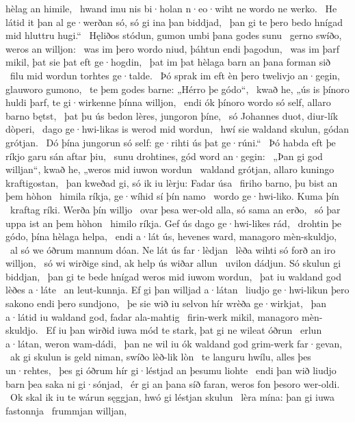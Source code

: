 hèlag an himile, \hld\ hwand imu nis bi·holan n·eo·wiht
ne wordo ne werko. \hld\ He látid it þan al ge·werðan só,
só gi ina þan biddjad, \hld\ þan gi te þero bedo hnígad
mid hluttru hugi.“ \hld\ Hęliðos stódun,
gumon umbi þana godes sunu \hld\ gerno swíðo,
weros an willjon: \hld\ was im þero wordo niud,
þáhtun endi þagodun, \hld\ was im þarf mikil,
þat sie þat eft ge·hogdin, \hld\ þat im þat hèlaga barn
an þana forman sið \hld\ filu mid wordun
torhtes ge·talde. \hld\ Þó sprak im eft èn þero twelivjo an·gegin,
glauworo gumono, \hld\ te þem godes barne:
„Hérro þe gódo“, \hld\ kwað he, „ús is þínoro huldi þarf,
te gi·wirkenne þínna willjon, \hld\ endi ók þínoro wordo só self,
allaro barno bętst, \hld\ þat þu ús bedon lères,
jungoron þíne, \hld\ só Johannes duot,
diur-lík dòperi, \hld\ dago ge·hwi-likas
is werod mid wordun, \hld\ hwí sie waldand skulun,
gódan grótjan. \hld\ Dó þína jungorun só self:
ge·rihti ús þat ge·rúni.“ \hld\ Þó habda eft þe ríkjo garu
sán aftar þiu, \hld\ sunu drohtines,
gód word an·gegin: \hld\ „Þan gi god willjan“, kwað he,
„weros mid iuwon wordun \hld\ waldand grótjan,
allaro kuningo kraftigostan, \hld\ þan kweðad gi, só ik iu lèrju:
Fadar úsa \hld\ firiho barno,
þu bist an þem hòhon \hld\ himila ríkja,
ge·wíhid sí þín namo \hld\ wordo ge·hwi-liko.
Kuma þín \hld\ kraftag ríki.
Werða þín willjo \hld\ ovar þesa wer-old alla,
só sama an erðo, \hld\ só þar uppa ist
an þem hòhon \hld\ himilo ríkja.
Gef ús dago ge·hwi-likes rád, \hld\ drohtin þe gódo,
þína hèlaga helpa, \hld\ endi a·lát ús, hevenes ward,
managoro mèn-skuldjo, \hld\ al só we óðrum mannum dóan.
Ne lát ús far·lèdjan \hld\ lèða wihti
só forð an iro willjon, \hld\ só wi wirðige sind,
ak help ús wiðar allun \hld\ uvilon dádjun.
Só skulun gi biddjan, \hld\ þan gi te bede hnígad
weros mid iuwom wordun, \hld\ þat iu waldand god
lèðes a·láte \hld\ an leut-kunnja.
Ef gi þan willjad a·látan \hld\ liudjo ge·hwi-likun
þero sakono endi þero sundjono, \hld\ þe sie wið iu selvon hír
wrèða ge·wirkjat, \hld\ þan a·látid iu waldand god,
fadar ala-mahtig \hld\ firin-werk mikil,
managoro mèn-skuldjo. \hld\ Ef iu þan wirðid iuwa mód te stark,
þat gi ne wileat óðrun \hld\ erlun a·látan,
weron wam-dádi, \hld\ þan ne wil iu ók waldand god
grim-werk far·gevan, \hld\ ak gi skulun is geld niman,
swíðo lèð-lik lòn \hld\ te languru hwílu,
alles þes un·rehtes, \hld\ þes gi óðrum hír
gi·léstjad an þesumu liohte \hld\ endi þan wið liudjo barn
þea saka ni gi·sónjad, \hld\ ér gi an þana síð faran,
weros fon þesoro wer-oldi. \hld\ Ok skal ik iu te wárun sęggjan,
hwó gi léstjan skulun \hld\ lèra mína:
þan gi iuwa fastonnja \hld\ frummjan willjan,
